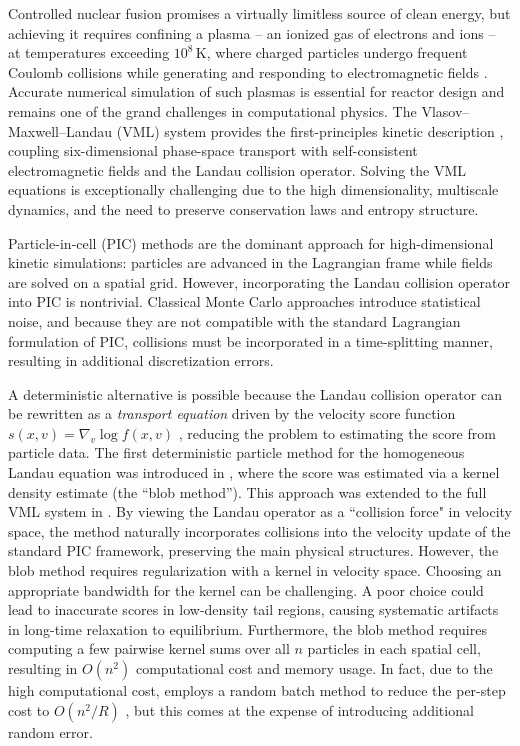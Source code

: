 \documentclass[]{article}
\numberwithin{equation}{section}
\begin{document}
Controlled nuclear fusion promises a virtually limitless source of clean energy, but achieving it requires confining a plasma -- an ionized gas of electrons and ions -- at temperatures exceeding $10^8$\,K, where charged particles undergo frequent Coulomb collisions while generating and responding to electromagnetic fields \citep{chen2016introduction}.  Accurate numerical simulation of such plasmas is essential for reactor design and remains one of the grand challenges in computational physics.  The Vlasov--Maxwell--Landau (VML) system provides the first-principles kinetic description \citep{landau1936kinetische, villani2002review}, coupling six-dimensional phase-space transport with self-consistent electromagnetic fields and the Landau collision operator.  Solving the VML equations is exceptionally challenging due to the high dimensionality, multiscale dynamics, and the need to preserve conservation laws and entropy structure.

Particle-in-cell (PIC) methods \citep{hockney1988computer, birdsall2018plasma} are the dominant approach for high-dimensional kinetic simulations: particles are advanced in the Lagrangian frame while fields are solved on a spatial grid.  However, incorporating the Landau collision operator into PIC is nontrivial.  Classical Monte Carlo approaches \citep{takizuka1977binary, bird1994molecular, manheimer1997langevin} introduce statistical noise, and because they are not compatible with the standard Lagrangian formulation of PIC, collisions must be incorporated in a time-splitting manner, resulting in additional discretization errors.

A deterministic alternative is possible because the Landau collision operator can be rewritten as a \emph{transport equation} driven by the velocity score function $s(x,v) = \nabla_v \log f(x,v)$ \citep{villani1998spatially}, reducing the problem to estimating the score from particle data.  The first deterministic particle method for the homogeneous Landau equation was introduced in \citep{carrillo2020particle}, where the score was estimated via a kernel density estimate (the ``blob method'').  This approach was extended to the full VML system in \citep{bailo2024collisional}. By viewing the Landau operator as a ``collision force" in velocity space, the method naturally incorporates collisions into the velocity update of the standard PIC framework, preserving the main physical structures. However, the blob method requires regularization with a kernel in velocity space. Choosing an appropriate bandwidth for the kernel can be challenging. A poor choice could lead to inaccurate scores in low-density tail regions, causing systematic artifacts in long-time relaxation to equilibrium. Furthermore, the blob method requires computing a few pairwise kernel sums over all $n$ particles in each spatial cell, resulting in $O(n^2)$ computational cost and memory usage. In fact, due to the high computational cost, \citep{bailo2024collisional} employs a random batch method to reduce the per-step cost to $O(n^2/R)$ \citep{carrillo2022random}, but this comes at the expense of introducing additional random error.
\end{document}
